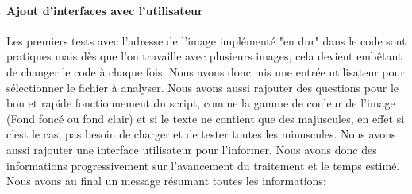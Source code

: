 \documentclass[a4paper,12pt,titlepage]{report}
\begin{document}
\paragraph{Ajout d'interfaces avec l'utilisateur}
	Les premiers tests avec l'adresse de l'image implémenté "en dur" dans le code sont pratiques mais dès que l'on travaille avec plusieurs images, cela devient embêtant de changer le code à chaque fois. Nous avons donc mis une entrée utilisateur pour sélectionner le fichier à analyser.
	Nous avons aussi rajouter des questions pour le bon et rapide fonctionnement du script, comme la gamme de couleur de l'image (Fond foncé ou fond clair) et si le texte ne contient que des majuscules, en effet si c'est le cas, pas besoin de charger et de tester toutes les minuscules.
	Nous avons aussi rajouter une interface utilisateur pour l'informer. Nous avons donc des informations progressivement sur l'avancement du traitement et le temps estimé. Nous avons au final un message résumant toutes les informations:
\end{document}
